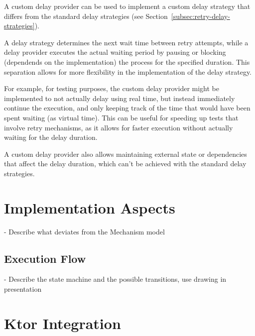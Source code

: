 A custom delay provider can be used
to implement a custom delay strategy that differs from the standard delay strategies (see Section~\ref{subsec:retry-delay-strategies}).

A delay strategy determines the next wait time between retry attempts,
while a delay provider executes the actual waiting period by pausing or blocking
(dependends on the implementation) the process for the specified duration.
This separation allows for more flexibility in the implementation of the delay strategy.

For example, for testing purposes, the custom delay provider might be implemented to not actually delay using real time,
but instead immediately continue the execution,
and only keeping track of the time that would have been spent waiting (as virtual time).
This can be useful for speeding up tests that involve retry mechanisms, as it allows for faster execution without actually waiting for the delay duration.

A custom delay provider also allows maintaining external state or dependencies that affect the delay duration,
which can't be achieved with the standard delay strategies.

\section{Implementation Aspects}\label{sec:retry-implementation-aspects}
- Describe what deviates from the Mechanism model

\subsection{Execution Flow}\label{subsec:retry-execution-flow}

- Describe the state machine and the possible transitions, use drawing in presentation


\section{Ktor Integration}\label{sec:retry-ktor-integration}
